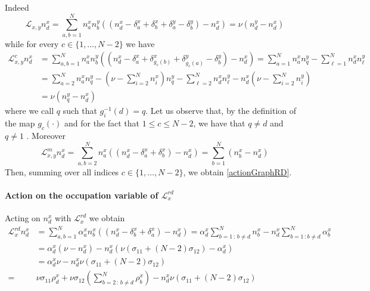 \documentclass[11pt]{article}
\numberwithin{equation}{section}
\numberwithin{equation}{subsection}
\begin{document}
Indeed
\begin{equation}
	\mathcal{L}_{x,y}n_{d}^{x}=\sum_{a,b=1}^{N}n_{a}^{x}n_{b}^{y}\left((n_{d}^{x}-\delta_{a}^{x}+\delta_{b}^{x}+\delta_{a}^{y}-\delta_{b}^{y})-n_{d}^{x}\right)=\nu\left(n_{d}^{y}-n_{d}^{x}\right)
\end{equation}
while for every $c\in \{1,\ldots,N-2\}$ we have 
\begin{equation}
	\begin{split}
		\mathcal{L}_{x,y}^{c}n_{d}^{x}&=\sum_{a,b=1}^{N}n_{a}^{x}n_{b}^{y}\left((n_{d}^{x}-\delta_{a}^{x}+\delta_{g_{c}(b)}^{x}+\delta_{g_{c}(a)}^{y}-\delta_{b}^{y})-n_{d}^{x}\right)=\sum_{a=1}^{N}n_{a}^{x}n_{q}^{y}-\sum_{\ell=1}^{N}n_{d}^{x}n_{\ell}^{y}
		\\&=
		\sum_{a=2}^{N}n_{a}^{x}n_{q}^{y}-\left(\nu-\sum_{i=2}^{N}n_{i}^{x}\right)n_{q}^{y}-\sum_{\ell=2}^{N}n_{d}^{x}n_{\ell}^{y}-n_{d}^{x}\left(\nu-\sum_{i=2}^{N}n_{i}^{y}\right)
		\\&=
		\nu(n_{q}^{y}-n_{d}^{x})
	\end{split}
\end{equation}
where we call $q$ such that $g_{i}^{-1}(d)=q$. Let us observe that, by the definition of the map $g_{c}(\cdot)$ and for the fact that $1\leq c\leq N-2$, we have that $q\neq d$ and $q\neq 1$ .
Moreover
\begin{equation}
	\mathcal{L}_{x,y}^{m}n_{d}^{x}=\sum_{a,b=2}^{N}n_{a}^{x}\left((n_{d}^{x}-\delta_{a}^{x}+\delta_{b}^{x})-n_{d}^{x}\right)=\sum_{b=1}^{N}(n_{b}^{x}-n_{d}^{x})
\end{equation}
Then, summing over all indices $c\in\{1,\ldots,N-2\}$, we obtain \eqref{actionGraphRD}.
\paragraph{Action on the occupation variable of $\mathcal{L}_{x}^{rd}$}
Acting on $n_{d}^{x}$  with $\mathcal{L}_{x}^{rd}$ we obtain
\begin{equation}\label{actionBoudaryRD}
	\begin{split}
		\mathcal{L}_{x}^{rd}n_{d}^{x}&=\sum_{a,b=1}^{N}\alpha_{a}^{x}n_{b}^{x}\left((n_{d}^{x}-\delta_{b}^{x}+\delta_{a}^{x})-n_{d}^{x}\right)=\alpha_{d}^{x}\sum_{b=1\,:\,b\neq d}^{N}n_{b}^{x}-n_{d}^{x}\sum_{b=1\,:b\neq d}^{N}\alpha_{b}^{x}
		\\&=
		\alpha_{d}^{x}\left(\nu-n_{d}^{x}\right)-n_{d}^{x}\left(\nu(\sigma_{11}+(N-2)\sigma_{12})-\alpha_{d}^{x}\right)
		\\&=\alpha_{d}^{x}\nu-n_{d}^{x}\nu(\sigma_{11}+(N-2)\sigma_{12})
		\\=&
		\nu\sigma_{11}\rho_{d}^{x}+\nu\sigma_{12}\left(\sum_{b=2\,:\,b\neq d}^{N}\rho_{b}^{x}\right)-n_{d}^{x}\nu(\sigma_{11}+(N-2)\sigma_{12})
	\end{split}
\end{equation}
\end{document}
